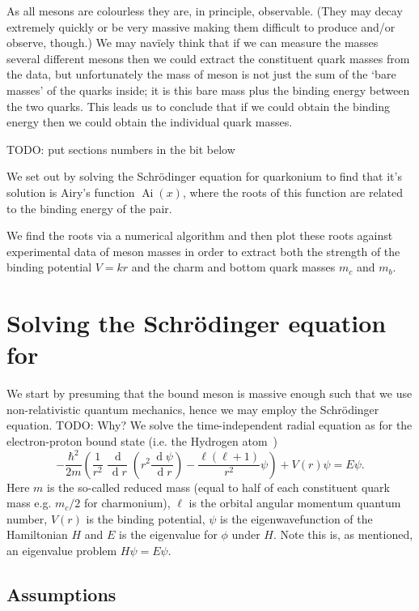 \documentclass[]{article}
\renewcommand{\d}[1]{\ensuremath{\,\operatorname{d}\!{#1}}}
\newcommand{\Ai}[1]{\ensuremath{\operatorname{Ai}({#1})}}
\begin{document}
As all mesons are colourless they are, in principle, observable. (They may decay extremely quickly or be very massive making them difficult to produce and/or observe, though.) We may nav\"{i}ely think that if we can measure the masses several different mesons then we could extract the constituent quark masses from the data, but unfortunately the mass of meson is not just the sum of the `bare masses' of the quarks inside; it is this bare mass plus the binding energy between the two quarks. This leads us to conclude that if we could obtain the binding energy then we could obtain the individual quark masses.

TODO: put sections numbers in the bit below

We set out by solving the Schr\"{o}dinger equation for quarkonium to find that it's solution is Airy's function $\Ai{x}$, where the roots of this function are related to the binding energy of the \qqbar pair.

We find the roots via a numerical algorithm and then plot these roots against experimental data of meson masses in order to extract both the strength of the binding potential $V=kr$ and the charm and bottom quark masses $m_{c}$ and $m_{b}$.


\section{Solving the Schr\"{o}dinger equation for \qqbar}\label{sec:schrodinger}

We start by presuming that the bound \qqbar meson is massive enough such that we use non-relativistic quantum mechanics, hence we may employ the Schr\"{o}dinger equation. TODO: Why? We solve the time-independent radial equation as for the electron-proton bound state (i.e. the Hydrogen atom~\cite{ref:dgriffithsquantum})
\[
-\frac{\hbar^{2}}{2m}\left (
	\frac{1}{r^{2}} \frac{\d{}}{\d{r}} \left (
		r^{2} \frac{\d{\psi}}{\d{r}}
	\right )
	- \frac{\ell(\ell+1)}{r^{2}}\psi
\right )
+ V(r)\psi = E\psi.
\]
Here $m$ is the so-called reduced mass (equal to half of each constituent quark mass e.g. $m_{c}/2$ for charmonium), $\ell$ is the orbital angular momentum quantum number, $V(r)$ is the binding potential, $\psi$ is the eigenwavefunction of the Hamiltonian $H$ and $E$ is the eigenvalue for $\phi$ under $H$. Note this is, as mentioned, an eigenvalue problem $H\psi=E\psi$.

\subsection{Assumptions}\label{ssec:assumptions}
\end{document}
